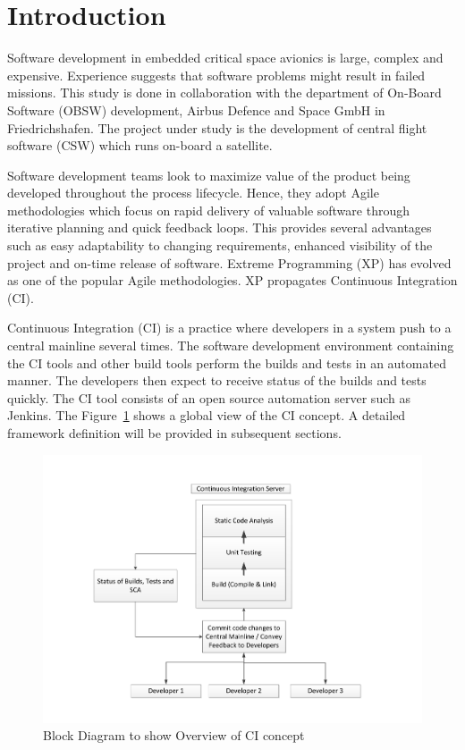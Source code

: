\documentclass[12pt, a4paper, titlepage]{scrartcl}
\newcommand\blankpage{%
    \null
    \thispagestyle{empty}%
    \newpage}
\begin{document}
\pagebreak
\afterpage{\blankpage}
\tableofcontents 
\newpage
\afterpage{\blankpage}
\listoffigures
\newpage

\section{Introduction}
\par Software development in embedded critical space avionics is large, complex and expensive. Experience suggests that software problems might result in failed missions. This study is done in collaboration with the department of On-Board Software (OBSW) development, Airbus Defence and Space GmbH in Friedrichshafen. The project under study is the development of central flight software (CSW) which runs on-board a satellite.
\par Software development teams look to maximize value of the product being developed throughout the process lifecycle. Hence, they adopt Agile methodologies\cite{cohen2003agile} which focus on rapid delivery of valuable software through iterative planning and quick feedback loops. This provides several advantages such as easy adaptability to changing requirements, enhanced visibility of the project and on-time release of software. Extreme Programming (XP)\cite{beck2000extreme} has evolved as one of the popular Agile methodologies. XP propagates Continuous Integration (CI). 
\par Continuous Integration (CI) is a practice where developers in a system push to a central mainline several times. The software development environment containing the CI tools and other build tools perform the builds and tests in an automated manner. The developers then expect to receive status of the builds and tests quickly. The CI tool consists of an open source automation server such as Jenkins\cite{jenkinsDoc}. The Figure~\ref{fig:ci-overview-block} shows a global view of the CI concept. A detailed framework definition will be provided in subsequent sections. 
\begin{figure}[!ht]
\centering
\hspace*{-1cm}
	\includegraphics[scale=0.59,clip, trim=0cm 1cm 0cm 1cm]{CI-workflow.pdf}
\caption{Block Diagram to show Overview of CI concept}
\label{fig:ci-overview-block}
\end{figure}
\end{document}
